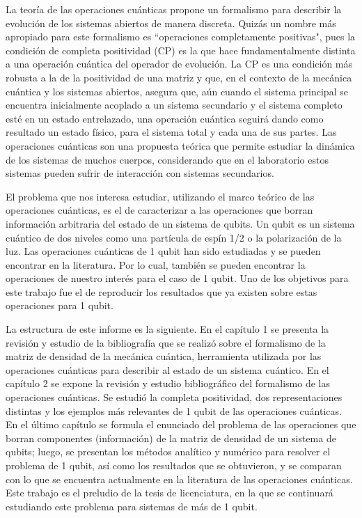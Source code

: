 La teoría de las operaciones cuánticas propone un formalismo para
describir la evolución de los sistemas abiertos de manera discreta. 
Quizás un nombre más apropiado para este formalismo es 
``operaciones completamente positivas", pues la condición 
de completa positividad (CP) es la que hace 
fundamentalmente distinta a una operación cuántica
del operador de evolución. La CP es una condición más robusta 
a la de la positividad de una matriz  y que, en el contexto de la
mecánica cuántica y los sistemas abiertos, asegura que, aún 
cuando el sistema principal se encuentra inicialmente acoplado 
a un sistema secundario y el sistema completo esté en 
un estado entrelazado, una operación cuántica seguirá
dando como resultado un estado físico, para el sistema total 
y cada una de sus partes. Las operaciones cuánticas son una 
propuesta teórica que permite estudiar la dinámica de los 
sistemas de muchos cuerpos, considerando que en el laboratorio 
estos sistemas pueden sufrir de interacción con sistemas secundarios.

El problema que nos interesa estudiar, utilizando el marco teórico de 
las operaciones cuánticas, es el de caracterizar a las
operaciones que borran información arbitraria del estado de un sistema
de qubits. Un qubit es un sistema cuántico de dos niveles 
como una partícula de espín 1/2 o la polarización de la luz. 
Las operaciones cuánticas de 1 qubit han sido estudiadas y 
se pueden encontrar en la literatura. Por lo cual, también 
se pueden encontrar la operaciones de nuestro interés para 
el caso de 1 qubit. Uno de los objetivos para este trabajo fue 
el de reproducir los resultados que ya existen sobre estas operaciones
para 1 qubit.

La estructura de este informe es la siguiente. En el capítulo 1
se presenta la revisión y estudio de la bibliografía que se realizó 
sobre el formalismo de la matriz de densidad de la mecánica cuántica, 
herramienta utilizada por las operaciones cuánticas para describir 
al estado de un sistema cuántico. En el capítulo 2 se expone 
la revisión y estudio bibliográfico del formalismo de las 
operaciones cuánticas. Se estudió la completa positividad, 
dos representaciones distintas y los ejemplos más relevantes 
de 1 qubit de las operaciones cuánticas. En el último capítulo
se formula el enunciado del problema de las operaciones que borran 
componentes (información) de la matriz de densidad de un sistema de 
qubits; luego, se presentan los métodos analítico y numérico 
para resolver el problema de 1 qubit, así como los resultados 
que se obtuvieron, y se comparan con lo que se encuentra actualmente
en la literatura de las operaciones cuánticas. Este trabajo 
es el preludio de la tesis de licenciatura, en la que se continuará 
estudiando este problema para sistemas de más de 1 qubit.



